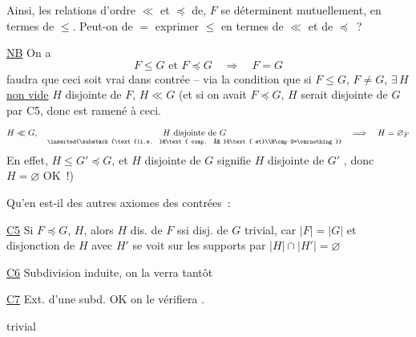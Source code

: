 
Ainsi, les relations d'ordre $\ll$ et $\preceq$ de, $F$ se déterminent mutuellement, en termes de $\leq$. Peut-on de $=$ exprimer $\leq$ en termes de $\ll$ et de $\preceq$~?

\uline{NB} On a
\[
 F\leq G\text{ et }F\preceq G\quad\Longrightarrow\quad F=G
\]
 faudra que ceci soit vrai dans  contrée -- via la condition que si $F\leq G$, $F\ne G$, $\exists\,H$  \uline{non vide} $H$ disjointe de $F$, $H\ll G$ (et si on avait $F\preceq G$, $H$ serait disjointe de $G$ par C5, donc  est ramené à ceci. 
\[
 H\ll G,\quad
 \underset{\inserted{\substack{\text{(i.e. }H\text{ comp. à }G\text{ et}\\H\cap G=\varnothing}}}{H\text{ disjointe de }G}
 \quad\Longrightarrow\quad H=\varnothing_{F}
\]
En effet, $H\leq G'\preceq G$,  et $H$ disjointe de $G$ signifie $H$ disjointe de $G'$ , donc $H=\varnothing$ OK~!)


Qu'en est-il des autres axiomes des contrées~:

\uline{C5} Si $F\preceq G$, $H$, alors $H$ dis. de $F$ ssi disj. de $G$ trivial, car $|F|=|G|$ et disjonction de $H$ avec $H'$ se voit sur les supports par $|H|\cap|H'|=\varnothing$

\uline{C6} Subdivision induite, on la verra tantôt

\uline{C7} Ext. d'une subd. OK on le vérifiera .

\uline{} trivial
